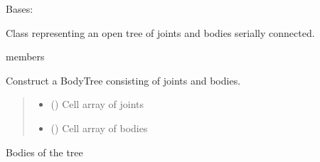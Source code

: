 \documentclass[letterpaper,10pt,english]{sphinxmanual}
\begin{document}
\begin{fulllineitems}
\label{\detokenize{bodytree:BodyTree}}
\pysigstartsignatures
{}
\pysigstopsignatures
\sphinxAtStartPar
Bases: 

\sphinxAtStartPar
Class representing an open tree of joints and bodies serially connected.

\begin{sphinxuseclass}{members}\begin{description}

\begin{fulllineitems}
\label{\detokenize{bodytree:BodyTree.BodyTree}}
\pysigstartsignatures
{}
\pysigstopsignatures
\sphinxAtStartPar
Construct a BodyTree consisting of joints and
bodies.
\begin{quote}\begin{description}
\begin{itemize}
\item {} 
\sphinxAtStartPar
{} ({\hyperref[\detokenize{joint:Joint}]{}}) \textendash{} Cell array of joints

\item {} 
\sphinxAtStartPar
{} ({\hyperref[\detokenize{body:Body}]{}}) \textendash{} Cell array of bodies

\end{itemize}

\end{description}\end{quote}

\end{fulllineitems}



\begin{fulllineitems}
\label{\detokenize{bodytree:BodyTree.Bodies}}
\pysigstartsignatures
{}
\pysigstopsignatures
\sphinxAtStartPar
Bodies of the tree


\end{fulllineitems}
\end{description}
\end{sphinxuseclass}
\end{fulllineitems}
\end{document}
